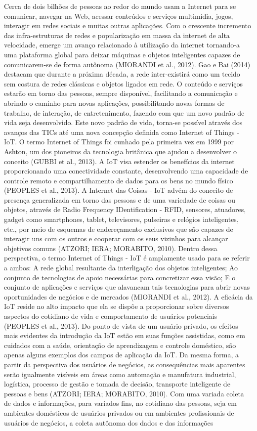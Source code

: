 Cerca de dois bilhões de pessoas ao redor do mundo usam a Internet para se comunicar, navegar na Web, acessar conteúdos e serviços multimídia, jogos, interagir em redes sociais e muitas outras aplicações. Com o crescente incremento das infra-estruturas de redes e popularização em massa da internet de alta velocidade, emerge um avanço relacionado à utilização da internet tornando-a uma plataforma global para deixar máquinas e objetos inteligentes capazes de comunicarem-se de forma autônoma (MIORANDI et al., 2012). Gao e Bai (2014) destacam que durante a próxima década, a rede inter-existirá como um tecido sem costura de redes clássicas e objetos ligados em rede. O conteúdo e serviços estarão em torno das pessoas, sempre disponível, facilitando a comunicação e abrindo o caminho para novas aplicações, possibilitando novas formas de trabalho, de interação, de entretenimento, fazendo com que um novo padrão de vida seja desenvolvido. Este novo padrão de vida, torna-se possível através dos avanços das TICs até uma nova concepção definida como Internet of Things - IoT. O termo Internet of Things foi cunhado pela primeira vez em 1999 por Ashton, um dos pioneiros da tecnologia britânica que ajudou a desenvolver o conceito (GUBBI et al., 2013). A IoT visa estender os benefícios da internet proporcionando uma conectividade constante, desenvolvendo uma capacidade de controle remoto e compartilhamento de dados para os bens no mundo físico (PEOPLES et al., 2013). A Internet das Coisas - IoT advém do conceito de presença generalizada em torno das pessoas e de uma variedade de coisas ou objetos, através de Radio Frequency IDentification - RFID, sensores, atuadores, gadget como smartphones, tablet, televisores, pulseiras e relógios inteligentes, etc., por meio de esquemas de endereçamento exclusivos que são capazes de interagir uns com os outros e cooperar com os seus vizinhos para alcançar objetivos comuns (ATZORI; IERA; MORABITO, 2010). Dentro dessa perspectiva, o termo Internet of Things - IoT é amplamente usado para se referir a ambos: A rede global resultante da interligação dos objetos inteligentes; Ao conjunto de tecnologias de apoio necessárias para concretizar essa visão; E o conjunto de aplicações e serviços que alavancam tais tecnologias para abrir novas oportunidades de negócios e de mercados (MIORANDI et al., 2012). A eficácia da IoT reside no alto impacto que ela se dispõe a proporcionar sobre diversos aspectos do cotidiano de vida e comportamento de usuários potenciais (PEOPLES et al., 2013). Do ponto de vista de um usuário privado, os efeitos mais evidentes da introdução da IoT estão em suas funções assistidas, como em cuidados com a saúde, orientação de aprendizagem e controle doméstico, são apenas alguns exemplos dos campos de aplicação da IoT. Da mesma forma, a partir da perspectiva dos usuários de negócios, as consequências mais aparentes serão igualmente visíveis em áreas como automação e manufatura industrial, logística, processo de gestão e tomada de decisão, transporte inteligente de pessoas e bens (ATZORI; IERA; MORABITO, 2010). Com uma variada coleta de dados e informações, para variados fins, no cotidiano das pessoas, seja em ambientes domésticos de usuários privados ou em ambientes profissionais de usuários de negócios, a coleta autônoma dos dados e das informações 